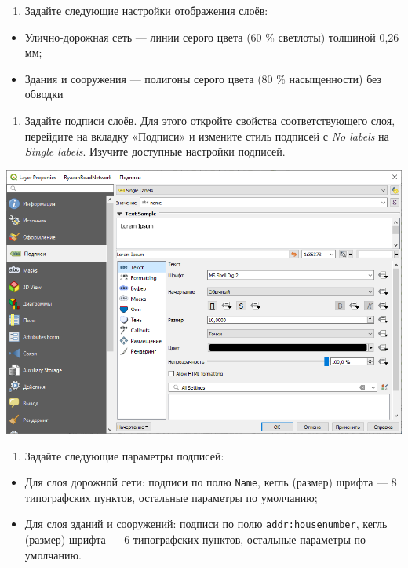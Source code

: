 \documentclass[
  12pt,
]{book}
\providecommand{\tightlist}{%
  \setlength{\itemsep}{0pt}\setlength{\parskip}{0pt}}
\begin{document}
\begin{enumerate}
\def\labelenumi{\arabic{enumi}.}
\setcounter{enumi}{3}
\tightlist
\item
  Задайте следующие настройки отображения слоёв:
\end{enumerate}

\begin{itemize}
\tightlist
\item
  Улично-дорожная сеть --- линии серого цвета (60 \% светлоты) толщиной 0,26 мм;
\item
  Здания и сооружения --- полигоны серого цвета (80 \% насыщенности) без обводки
\end{itemize}

\begin{enumerate}
\def\labelenumi{\arabic{enumi}.}
\setcounter{enumi}{4}
\tightlist
\item
  Задайте подписи слоёв. Для этого откройте свойства соответствующего слоя, перейдите на вкладку «Подписи» и измените стиль подписей с \emph{No labels} на \emph{Single labels}. Изучите доступные настройки подписей.
\end{enumerate}

\includegraphics{images/Ex11_RoadNetwork/labels_settings.png}

\begin{enumerate}
\def\labelenumi{\arabic{enumi}.}
\setcounter{enumi}{5}
\tightlist
\item
  Задайте следующие параметры подписей:
\end{enumerate}

\begin{itemize}
\tightlist
\item
  Для слоя дорожной сети: подписи по полю \texttt{Name}, кегль (размер) шрифта --- 8 типографских пунктов, остальные параметры по умолчанию;
\item
  Для слоя зданий и сооружений: подписи по полю \texttt{addr:housenumber}, кегль (размер) шрифта --- 6 типографских пунктов, остальные параметры по умолчанию.
\end{itemize}
\end{document}
